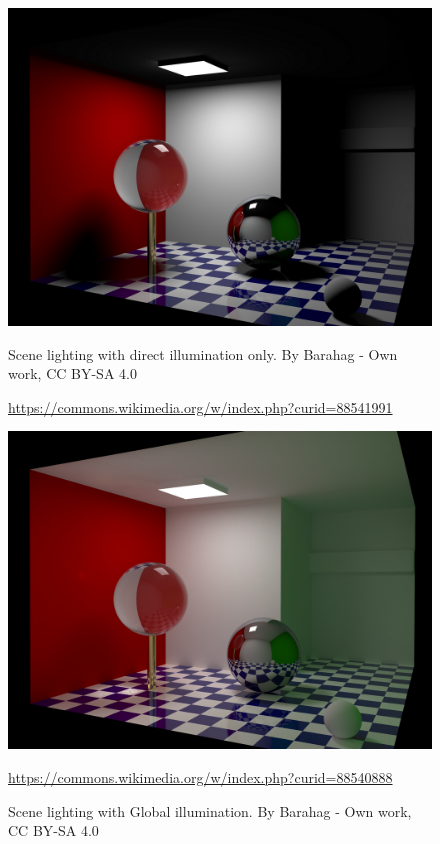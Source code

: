 \begin{figure}[!htb]
	\begin{minipage}{0.48\textwidth}
		\centering
		\includegraphics[scale=0.65]{Graphics/Direct_lighting.png}
		\caption{Scene lighting with direct illumination only. By Barahag - Own work, CC BY-SA 4.0}
		\url{https://commons.wikimedia.org/w/index.php?curid=88541991}
		\label{gra:Direct Illumination}
	\end{minipage}\hfill
	\begin{minipage}{0.48\textwidth}
		\centering
		\includegraphics[scale=0.65]{Graphics/Global_illumination.png}
		\caption{Scene lighting with Global illumination. By Barahag - Own work, CC BY-SA 4.0}
		\url{https://commons.wikimedia.org/w/index.php?curid=88540888}
		\label{gra:Global Illumination}
	\end{minipage}
\end{figure}

